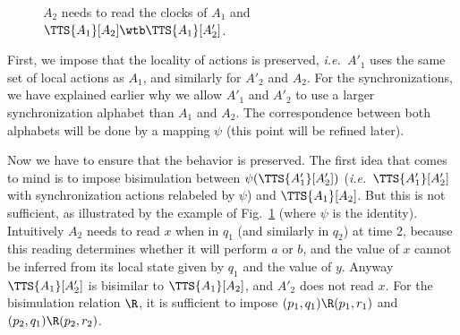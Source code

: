 \documentclass{LMCS}
\theoremstyle{plain}\newtheorem*{prop11}{Proposition~\ref{prop:states} bis}
\def\ie{{\em i.e.\ }}
\begin{document}
\begin{figure}[t]
  \caption{$A_2$ needs to read the clocks of $A_1$ and
  $\TTS{A_1}[A_2]\wtb\TTS{A_1}[A'_2]$. \label{fig:bisim}}
\end{figure}

First, we impose that the locality of actions is preserved, \ie $A'_1$ uses
the same set of local actions as $A_1$, and similarly for $A'_2$ and
$A_2$. For the synchronizations, we have explained earlier why we allow
$A'_1$ and $A'_2$ to use a larger synchronization alphabet than $A_1$ and
$A_2$. The correspondence between both alphabets will be done by a mapping
$\psi$ (this point will be refined later).

Now we have to ensure that the behavior is preserved. The first idea that comes
to mind is to impose bisimulation between $\psi(\TTS{A'_1}[A'_2])$
(\ie $\TTS{A'_1}[A'_2]$ with synchronization actions relabeled by
$\psi$) and $\TTS{A_1}[A_2]$. But this is not sufficient, as illustrated by
the example of Fig.~\ref{fig:bisim} (where $\psi$ is the identity).
Intuitively $A_2$ needs to read $x$ when in $q_{1}$ (and similarly in
$q_{2}$) at time 2, because this reading determines whether it will
perform $a$ or $b$, and the value of $x$ cannot be inferred from its local
state given by $q_{1}$ and the value of $y$. Anyway $\TTS{A_1}[A'_2]$
is bisimilar to $\TTS{A_1}[A_2]$, and $A'_2$ does not read $x$.
For the bisimulation relation $\R$, it is sufficient to impose
$(p_{1},q_{1})\R(p_{1},r_{1})$ and
$(p_{2},q_{1})\R(p_{2},r_{2})$.
\end{document}
